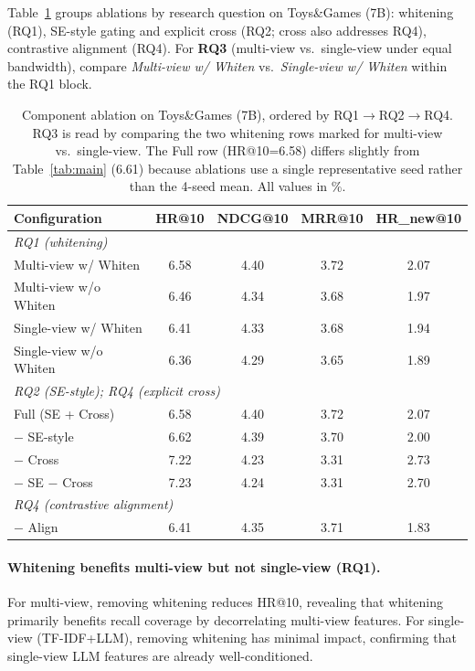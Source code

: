 \documentclass[sigconf,natbib=true,anonymous]{acmart}
\begin{document}
Table~\ref{tab:ablation} groups ablations by research question on
Toys\&Games (7B): whitening (RQ1), SE-style gating and explicit cross
(RQ2; cross also addresses RQ4), contrastive alignment (RQ4).
For \textbf{RQ3} (multi-view vs.\ single-view under equal bandwidth),
compare \emph{Multi-view w/ Whiten} vs.\ \emph{Single-view w/ Whiten}
within the RQ1 block.

\begin{table}[t]
\caption{Component ablation on Toys\&Games (7B), ordered by RQ1$\rightarrow$RQ2$\rightarrow$RQ4.
RQ3 is read by comparing the two whitening rows marked for multi-view vs.\ single-view.
The Full row (HR@10=6.58) differs slightly from Table~\ref{tab:main} (6.61) because ablations use a single representative seed rather than the 4-seed mean.
All values in \%.}
\label{tab:ablation}
\centering
\scriptsize
\begin{tabular}{@{}lcccc@{}}
\toprule
\textbf{Configuration} & HR@10 & NDCG@10 & MRR@10 & HR\_new@10 \\
\midrule
\multicolumn{5}{l}{\textit{RQ1 (whitening)}} \\
Multi-view w/ Whiten & 6.58 & 4.40 & 3.72 & 2.07 \\
Multi-view w/o Whiten & 6.46 & 4.34 & 3.68 & 1.97 \\
Single-view w/ Whiten & 6.41 & 4.33 & 3.68 & 1.94 \\
Single-view w/o Whiten & 6.36 & 4.29 & 3.65 & 1.89 \\
\midrule
\multicolumn{5}{l}{\textit{RQ2 (SE-style); RQ4 (explicit cross)}} \\
Full (SE + Cross) & 6.58 & 4.40 & 3.72 & 2.07 \\
$-$ SE-style & 6.62 & 4.39 & 3.70 & 2.00 \\
$-$ Cross & 7.22 & 4.23 & 3.31 & 2.73 \\
$-$ SE $-$ Cross & 7.23 & 4.24 & 3.31 & 2.70 \\
\midrule
\multicolumn{5}{l}{\textit{RQ4 (contrastive alignment)}} \\
$-$ Align & 6.41 & 4.35 & 3.71 & 1.83 \\
\bottomrule
\end{tabular}
\end{table}

\paragraph{Whitening benefits multi-view but not single-view (RQ1).}
For multi-view, removing whitening reduces HR@10, revealing
that whitening primarily benefits recall coverage by decorrelating
multi-view features. For single-view (TF-IDF+LLM), removing
whitening has minimal impact, confirming that single-view LLM
features are already well-conditioned.
\end{document}
